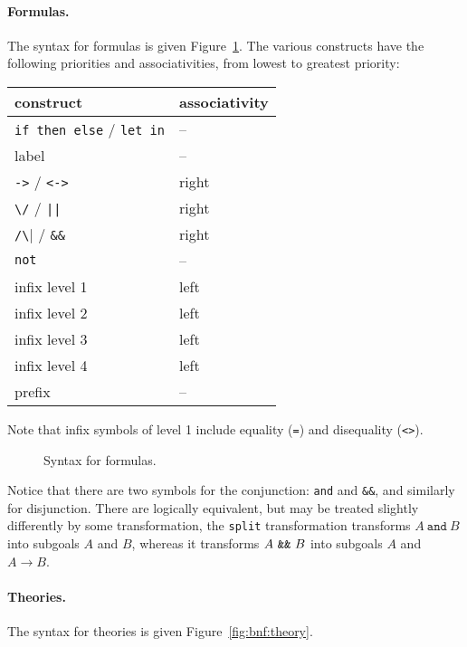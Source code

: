 \paragraph{Formulas.}
The syntax for formulas is given Figure~\ref{fig:bnf:formula}.
The various constructs have the following priorities and
associativities, from lowest to greatest priority:
\begin{center}
  \begin{tabular}{|l|l|}
    \hline
    construct & associativity \\
    \hline\hline
    \texttt{if then else} / \texttt{let in} & -- \\
    label & -- \\
    \texttt{->} / \texttt{<->} & right \\
    \verb!\/! / \verb!||! & right \\
    \verb|/\| / \verb!&&! & right \\
    \texttt{not}  & -- \\
    infix level 1 & left \\
    infix level 2 & left \\
    infix level 3 & left \\
    infix level 4 & left \\
    prefix        & --   \\
    \hline
  \end{tabular}
\end{center}
Note that infix symbols of level 1 include equality (\texttt{=}) and
disequality (\texttt{<>}).

\begin{figure}
  \begin{center}\framebox{}\end{center}
  \caption{Syntax for formulas.}
\label{fig:bnf:formula}
\end{figure}

Notice that there are two symbols for the conjunction: \texttt{and}
and \verb|&&|, and similarly for disjunction. There are logically
equivalent, but may be treated slightly differently by some
transformation, \eg{} the \texttt{split} transformation transforms
$A~\texttt{and}~B$ into subgoals $A$ and $B$, whereas it transforms
$A~\verb|&&|~B$ into subgoals $A$ and $A\rightarrow B$.

\paragraph{Theories.}
The syntax for theories is given Figure~\ref{fig:bnf:theory}.

